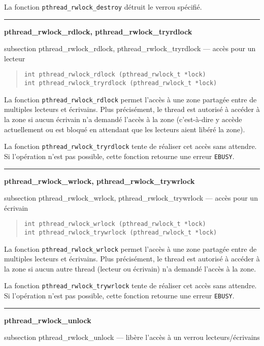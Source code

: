 \documentclass [twoside] {report}
\newcommand {\primitive} [1]
    {
	{\large \bf #1}
	\addcontentsline {toc} {subsection} {#1}
    }
\newcommand {\separation}
    {
	\vspace {7mm}
	\nopagebreak
	\hrule
    }
\begin{document}
La fonction \verb|pthread_rwlock_destroy| détruit le verrou spécifié.


\separation
\primitive {pthread\_rwlock\_rdlock, pthread\_rwlock\_tryrdlock} --- accès pour un lecteur

\begin {quote}
\begin {verbatim}
int pthread_rwlock_rdlock (pthread_rwlock_t *lock)
int pthread_rwlock_tryrdlock (pthread_rwlock_t *lock)
\end{verbatim}
\end {quote}

La fonction \verb|pthread_rwlock_rdlock| permet l'accès à une zone
partagée entre de multiples lecteurs et écrivains. Plus précisément,
le thread est autorisé à accéder à la zone si aucun écrivain n'a
demandé l'accès à la zone (c'est-à-dire y accède actuellement ou
est bloqué en attendant que les lecteurs aient libéré la zone).

La fonction \verb|pthread_rwlock_tryrdlock| tente de réaliser cet accès
sans attendre. Si l'opération n'est pas possible, cette fonction retourne
une erreur \texttt {EBUSY}.


\separation
\primitive {pthread\_rwlock\_wrlock, pthread\_rwlock\_trywrlock} --- accès pour un écrivain

\begin {quote}
\begin {verbatim}
int pthread_rwlock_wrlock (pthread_rwlock_t *lock)
int pthread_rwlock_trywrlock (pthread_rwlock_t *lock)
\end{verbatim}
\end {quote}

La fonction \verb|pthread_rwlock_wrlock| permet l'accès à une zone
partagée entre de multiples lecteurs et écrivains. Plus précisément,
le thread est autorisé à accéder à la zone si aucun autre thread
(lecteur ou écrivain) n'a demandé l'accès à la zone.

La fonction \verb|pthread_rwlock_trywrlock| tente de réaliser cet
accès sans attendre.  Si l'opération n'est pas possible, cette fonction
retourne une erreur \texttt {EBUSY}.



\separation
\primitive {pthread\_rwlock\_unlock} --- libère l'accès à un verrou
lecteurs/écrivains
\end{document}
